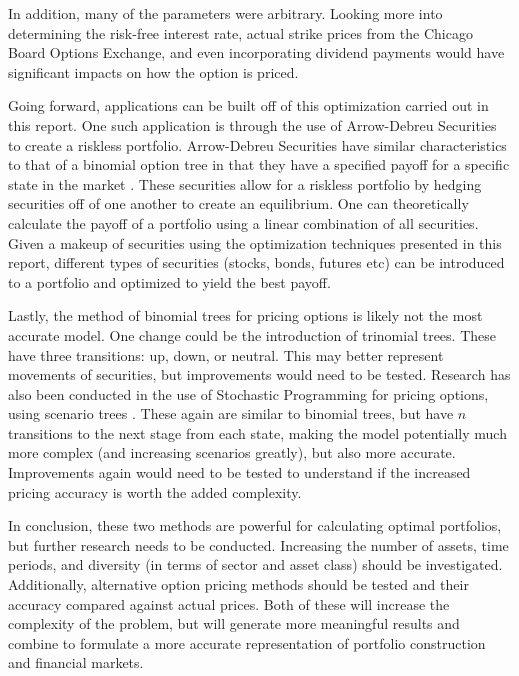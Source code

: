 \documentclass[12pt]{article}
\begin{document}
In addition, many of the parameters were arbitrary. Looking more into determining the risk-free interest rate, actual strike prices from the Chicago Board Options Exchange, and even incorporating dividend payments would have significant impacts on how the option is priced. 
	
Going forward, applications can be built off of this optimization carried out in this report. One such application is through the use of Arrow-Debreu Securities to create a riskless portfolio. Arrow-Debreu Securities have similar characteristics to that of a binomial option tree in that they have a specified payoff for a specific state in the market \cite{tirole2010theory, AD_secs}. These securities allow for a riskless portfolio by hedging securities off of one another to create an equilibrium. One can theoretically calculate the payoff of a portfolio using a linear combination of all securities. Given a makeup of securities using the optimization techniques presented in this report, different types of securities (stocks, bonds, futures etc) can be introduced to a portfolio and optimized to yield the best payoff.
	
Lastly, the method of binomial trees for pricing options is likely not the most accurate model. One change could be the introduction of trinomial trees. These have three transitions: up, down, or neutral. This may better represent movements of securities, but improvements would need to be tested. Research has also been conducted in the use of Stochastic Programming for pricing options, using scenario trees \cite{stoc_prog_option}. These again are similar to binomial trees, but have $n$ transitions to the next stage from each state, making the model potentially much more complex (and increasing scenarios greatly), but also more accurate. Improvements again would need to be tested to understand if the increased pricing accuracy is worth the added complexity.

In conclusion, these two methods are powerful for calculating optimal portfolios, but further research needs to be conducted. Increasing the number of assets, time periods, and diversity (in terms of sector and asset class) should be investigated. Additionally, alternative option pricing methods should be tested and their accuracy compared against actual prices. Both of these will increase the complexity of the problem, but will generate more meaningful results and combine to formulate a more accurate representation of portfolio construction and financial markets.


\newpage
{}






\end{document}
